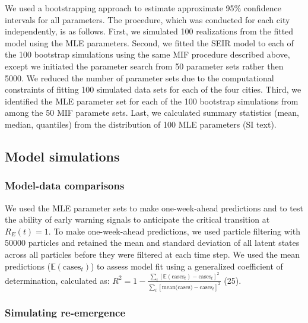 \documentclass[3p]{elsarticle} %
\begin{document}
We used a bootstrapping approach to estimate approximate 95\% confidence
intervals for all parameters. The procedure, which was conducted for
each city independently, is as follows. First, we simulated 100
realizations from the fitted model using the MLE parameters. Second, we
fitted the SEIR model to each of the 100 bootstrap simulations using the
same MIF procedure described above, except we initiated the parameter
search from 50 parameter sets rather then 5000. We reduced the number of
parameter sets due to the computational constraints of fitting 100
simulated data sets for each of the four cities. Third, we identified
the MLE parameter set for each of the 100 bootstrap simulations from
among the 50 MIF paramete sets. Last, we calculated summary statistics
(mean, median, quantiles) from the distribution of 100 MLE parameters
(SI text).

\hypertarget{model-simulations}{%
\subsection{Model simulations}\label{model-simulations}}

\hypertarget{model-data-comparisons}{%
\subsubsection{Model-data comparisons}\label{model-data-comparisons}}

We used the MLE parameter sets to make one-week-ahead predictions and to
test the ability of early warning signals to anticipate the critical
transition at \(R_E(t) = 1\). To make one-week-ahead predictions, we
used particle filtering with 50000 particles and retained the mean and
standard deviation of all latent states across all particles before they
were filtered at each time step. We used the mean predictions
(\(\mathbb{E}(\text{cases}_t)\)) to assess model fit using a generalized
coefficient of determination, calculated as:
\(R^2 = 1 - \frac{\sum_t [\mathbb{E}(\text{cases}_t) - \text{cases}_t]^2}{\sum_t [\text{mean(cases)}-\text{cases}_t]^2}\)
(25).

\hypertarget{simulating-re-emergence}{%
\subsubsection{Simulating re-emergence}\label{simulating-re-emergence}}
\end{document}
